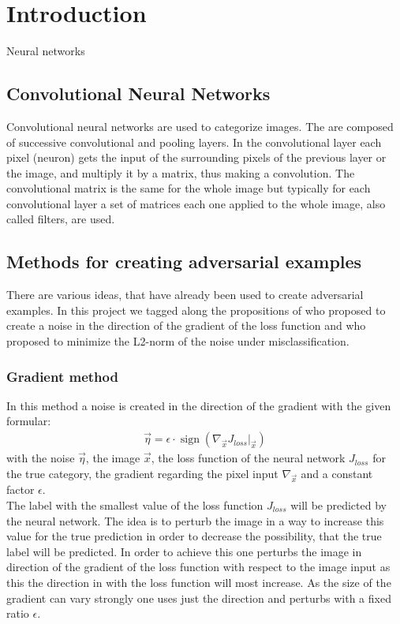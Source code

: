 \documentclass[%
 reprint,
 amsmath,amssymb,
 aps,
]{revtex4-1}
\begin{document}

\section{Introduction}

Neural networks 

\subsection{Convolutional Neural Networks}

Convolutional neural networks are used to categorize images. The are composed of successive convolutional and pooling layers. In the convolutional layer each pixel (neuron) gets the input of the surrounding pixels of the previous layer or the image, and multiply it by a matrix, thus making a convolution. The convolutional matrix is the same for the whole image but typically for each convolutional layer a set of matrices each one applied to the whole image, also called filters, are used. 

\subsection{Methods for creating adversarial examples}

There are various ideas, that have already been used to create adversarial examples. In this project we tagged along the propositions of \citeauthor{paperGrad} who proposed to create a noise in the direction of the gradient of the loss function and \citeauthor{paperMinimize} who proposed to minimize the L2-norm of the noise under misclassification.
\subsubsection*{Gradient method}
In this method a noise is created in the direction of the gradient with the given formular:
\begin{align*}
\vec{\eta} = \epsilon \cdot \operatorname{sign} \left( \nabla_{\vec{x}} J_{loss} \big \vert_{\vec{x}} \right) 
\end{align*}
with the noise $\vec{\eta}$, the image $\vec{x}$, the loss function of the neural network $J_{loss}$ for the true category, the gradient regarding the pixel input $\nabla_{\vec{x}}$ and a constant factor $\epsilon$.\\
The label with the smallest value of the loss function $J_{loss}$ will be predicted by the neural network. The idea is to perturb the image in a way to increase this value for the true prediction in order to decrease the possibility, that the true label will be predicted. In order to achieve this one perturbs the image in direction of the gradient of the loss function with respect to the image input as this the direction in with the loss function will most increase. As the size of the gradient can vary strongly one uses just the direction and perturbs with a fixed ratio $\epsilon$. \cite{paperGrad}
\end{document}

